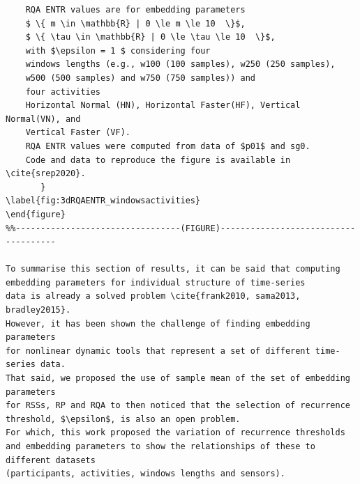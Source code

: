 \documentclass[10pt]{article}
\begin{document}
\begin{verbatim}
	RQA ENTR values are for embedding parameters
	$ \{ m \in \mathbb{R} | 0 \le m \le 10  \}$,
	$ \{ \tau \in \mathbb{R} | 0 \le \tau \le 10  \}$, 
	with $\epsilon = 1 $ considering four 
	windows lengths (e.g., w100 (100 samples), w250 (250 samples),
	w500 (500 samples) and w750 (750 samples)) and
	four activities 
	Horizontal Normal (HN), Horizontal Faster(HF), Vertical Normal(VN), and 
	Vertical Faster (VF).
	RQA ENTR values were computed from data of $p01$ and sg0.
	Code and data to reproduce the figure is available in \cite{srep2020}.
       }
\label{fig:3dRQAENTR_windowsactivities}
\end{figure}
%%---------------------------------(FIGURE)-------------------------------------

To summarise this section of results, it can be said that computing
embedding parameters for individual structure of time-series 
data is already a solved problem \cite{frank2010, sama2013, bradley2015}. 
However, it has been shown the challenge of finding embedding parameters 
for nonlinear dynamic tools that represent a set of different time-series data.
That said, we proposed the use of sample mean of the set of embedding parameters
for RSSs, RP and RQA to then noticed that the selection of recurrence 
threshold, $\epsilon$, is also an open problem.
For which, this work proposed the variation of recurrence thresholds 
and embedding parameters to show the relationships of these to different datasets 
(participants, activities, windows lengths and sensors).




\end{verbatim}
\end{document}
